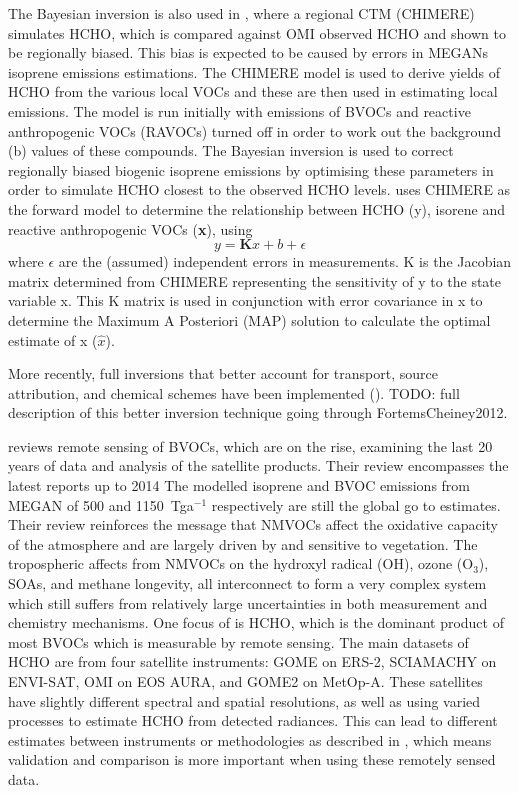   The Bayesian inversion is also used in \cite{Curci2010}, where a regional CTM (CHIMERE) simulates HCHO, which is compared against OMI observed HCHO and shown to be regionally biased.
  This bias is expected to be caused by errors in MEGANs isoprene emissions estimations.
  The CHIMERE model is used to derive yields of HCHO from the various local VOCs and these are then used in estimating local emissions.
  The model is run initially with emissions of BVOCs and reactive anthropogenic VOCs (RAVOCs) turned off in order to work out the background (b) values of these compounds.
  The Bayesian inversion is used to correct regionally biased biogenic isoprene emissions by optimising these parameters in order to simulate HCHO closest to the observed HCHO levels.
  \cite{Curci2010} uses CHIMERE as the forward model to determine the relationship between HCHO (y), isorene and reactive anthropogenic VOCs (\textbf{x}), using 
  \begin{equation}
  y=\mathbf{K}x + b + \epsilon
  \end{equation}
  where $\epsilon$ are the (assumed) independent errors in measurements.
  K is the Jacobian matrix determined from CHIMERE representing the sensitivity of y to the state variable x.
  This K matrix is used in conjunction with error covariance in x to determine the Maximum A Posteriori (MAP) solution to calculate the optimal estimate of x ($\hat{x}$).
  
  
  More recently, full inversions that better account for transport, source attribution, and chemical schemes have been implemented (\cite{FortemsCheiney2012}).
  TODO: full description of this better inversion technique going through FortemsCheiney2012.
  
  
  \cite{Kefauver2014} reviews remote sensing of BVOCs, which are on the rise, examining the last 20 years of data and analysis of the satellite products.
  Their review encompasses the latest reports up to 2014
  The modelled isoprene and BVOC emissions from MEGAN \citep{Guenther2000} of 500 and 1150~Tga$^{-1}$ respectively are still the global go to estimates.
  Their review reinforces the message that NMVOCs affect the oxidative capacity of the atmosphere and are largely driven by and sensitive to vegetation.
  The tropospheric affects from NMVOCs on the hydroxyl radical (OH), ozone (O$_3$), SOAs, and methane longevity, all interconnect to form a very complex system which still suffers from relatively large uncertainties in both measurement and chemistry mechanisms.
  One focus of \cite{Kefauver2014} is HCHO, which is the dominant product of most BVOCs which is measurable by remote sensing.
  The main datasets of HCHO are from four satellite instruments: GOME on ERS-2, SCIAMACHY on ENVI-SAT, OMI on EOS AURA, and GOME2 on MetOp-A.
  These satellites have slightly different spectral and spatial resolutions, as well as using varied processes to estimate HCHO from detected radiances.
  This can lead to different estimates between instruments or methodologies as described in \cite{Lorent2017}, which means validation and comparison is more important when using these remotely sensed data.
  
